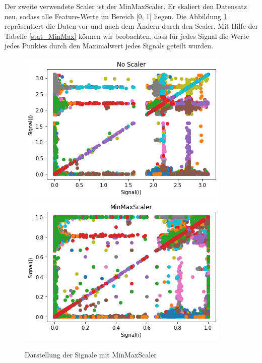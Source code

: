 \documentclass[12pt,a4paper]{scrartcl}
\numberwithin{equation}{section}
\begin{document}
Der zweite verwendete Scaler ist der MinMaxScaler. Er skaliert den Datensatz neu, sodass alle Feature-Werte im Bereich [0, 1] liegen. Die Abbildung \ref{MinMaxScaler} repräsentiert die Daten vor und nach dem Ändern durch den Scaler. Mit Hilfe der Tabelle \ref{stat_MinMax} können wir beobachten, dass für jedes Signal die Werte jedes Punktes durch den Maximalwert jedes Signals geteilt wurden. 

\begin{figure}[ht!]
	\centering
	  \includegraphics[scale=0.5]{noScaler.png}
	  \includegraphics[scale=0.5]{MinMaxScaler.png}
	  \caption{Darstellung der Signale mit MinMaxScaler}
	\label{MinMaxScaler}
\end{figure}
\end{document}
